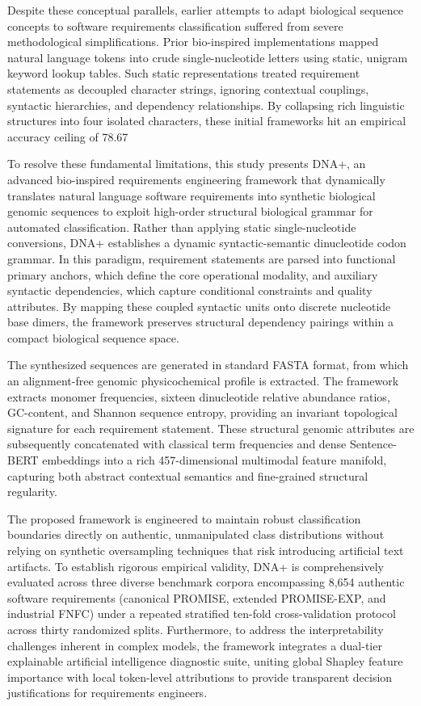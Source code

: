 Despite these conceptual parallels, earlier attempts to adapt biological sequence concepts to software requirements classification suffered from severe methodological simplifications. Prior bio-inspired implementations mapped natural language tokens into crude single-nucleotide letters using static, unigram keyword lookup tables. Such static representations treated requirement statements as decoupled character strings, ignoring contextual couplings, syntactic hierarchies, and dependency relationships. By collapsing rich linguistic structures into four isolated characters, these initial frameworks hit an empirical accuracy ceiling of 78.67%

To resolve these fundamental limitations, this study presents DNA+, an advanced bio-inspired requirements engineering framework that dynamically translates natural language software requirements into synthetic biological genomic sequences to exploit high-order structural biological grammar for automated classification. Rather than applying static single-nucleotide conversions, DNA+ establishes a dynamic syntactic-semantic dinucleotide codon grammar. In this paradigm, requirement statements are parsed into functional primary anchors, which define the core operational modality, and auxiliary syntactic dependencies, which capture conditional constraints and quality attributes. By mapping these coupled syntactic units onto discrete nucleotide base dimers, the framework preserves structural dependency pairings within a compact biological sequence space.

The synthesized sequences are generated in standard FASTA format, from which an alignment-free genomic physicochemical profile is extracted. The framework extracts monomer frequencies, sixteen dinucleotide relative abundance ratios, GC-content, and Shannon sequence entropy, providing an invariant topological signature for each requirement statement. These structural genomic attributes are subsequently concatenated with classical term frequencies and dense Sentence-BERT embeddings into a rich 457-dimensional multimodal feature manifold, capturing both abstract contextual semantics and fine-grained structural regularity.

The proposed framework is engineered to maintain robust classification boundaries directly on authentic, unmanipulated class distributions without relying on synthetic oversampling techniques that risk introducing artificial text artifacts. To establish rigorous empirical validity, DNA+ is comprehensively evaluated across three diverse benchmark corpora encompassing 8,654 authentic software requirements (canonical PROMISE, extended PROMISE-EXP, and industrial FNFC) under a repeated stratified ten-fold cross-validation protocol across thirty randomized splits. Furthermore, to address the interpretability challenges inherent in complex models, the framework integrates a dual-tier explainable artificial intelligence diagnostic suite, uniting global Shapley feature importance with local token-level attributions to provide transparent decision justifications for requirements engineers.

